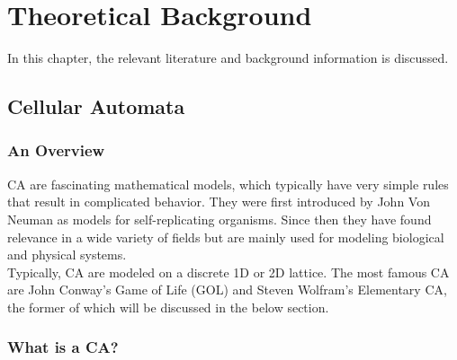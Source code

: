 
\chapter{Theoretical Background} %
\label{Chapter2} %
In this chapter, the relevant literature and background information is discussed.  
\section{Cellular Automata}
\subsection{An Overview}

CA are fascinating mathematical models, which typically have very simple rules that result in complicated behavior. They were first introduced by John Von Neuman \cite{sarkar2000brief} as models for self-replicating organisms. Since then they have found relevance in a wide variety of fields but are mainly used for modeling biological and physical systems. \\

Typically, CA are modeled on a discrete 1D or 2D lattice. The most famous CA are John Conway's Game of Life (GOL) and Steven Wolfram's Elementary CA, the former of which will be discussed in the below section.
\subsection{What is a CA?}

